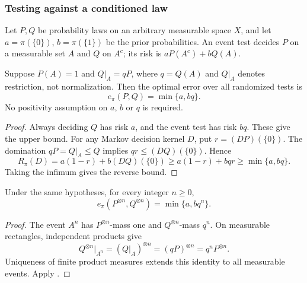 \subsubsection{Testing against a conditioned law}
\label{sec:testing-conditioning}

Let $P,Q$ be probability laws on an arbitrary measurable space $X$,
and let $a=\pi(\{0\})$, $b=\pi(\{1\})$ be the prior probabilities.
An event test decides $P$ on a measurable set $A$ and $Q$ on $A^c$;
its risk is $aP(A^c)+bQ(A)$.

\begin{theorem}
\label{thm:conditioning-error}
Suppose $P(A)=1$ and $Q|_A=qP$, where $q=Q(A)$ and $Q|_A$
denotes restriction, not normalization. Then the optimal error over
all randomized tests is
\[
 e_\pi(P,Q)=\min\{a,bq\}.
\]
No positivity assumption on $a$, $b$ or $q$ is required.
\end{theorem}
\begin{proof}
Always deciding $Q$ has risk $a$, and the event test has risk $bq$.
These give the upper bound. For any Markov decision kernel $D$, put
$r=(DP)(\{0\})$. The domination $qP=Q|_A\le Q$ implies
$q r\le(DQ)(\{0\})$. Hence
\[
 R_\pi(D)=a(1-r)+b(DQ)(\{0\})
 \ge a(1-r)+bqr\ge\min\{a,bq\}.
\]
Taking the infimum gives the reverse bound.
\end{proof}

\begin{corollary}
\label{cor:conditioning-iid}
Under the same hypotheses, for every integer $n\ge0$,
\[
 e_\pi(P^{\otimes n},Q^{\otimes n})=\min\{a,bq^n\}.
\]
\end{corollary}
\begin{proof}
The event $A^n$ has $P^{\otimes n}$-mass one and
$Q^{\otimes n}$-mass $q^n$. On measurable rectangles, independent
products give
\[
 Q^{\otimes n}|_{A^n}=(Q|_A)^{\otimes n}
 =(qP)^{\otimes n}=q^n P^{\otimes n}.
\]
Uniqueness of finite product measures extends this identity to
all measurable events. Apply .
\end{proof}
